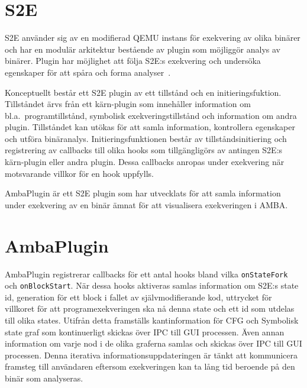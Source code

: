 
\section{S2E}
S2E använder sig av en modifierad QEMU instans för exekvering av olika
binärer och har en modulär arkitektur bestående av plugin som
möjliggör analys av binärer. Plugin har möjlighet att följa S2E:s
exekvering och undersöka egenskaper för att spåra och forma
analyser~\cite{Chipounov12}.

Konceptuellt består ett S2E plugin av ett tillstånd och en
initieringsfuktion. Tillståndet ärvs från ett kärn-plugin som
innehåller information om bl.a.\ programtillstånd, symbolisk
exekveringstillstånd och information om andra plugin. Tillståndet kan
utökas för att samla information, kontrollera egenskaper och utföra
binäranalys. Initieringsfunktionen består av tillståndsinitiering och
registrering av callbacks till olika hooks som tillgängligörs av
antingen S2E:s kärn-plugin eller andra plugin. Dessa callbacks anropas
under exekvering när motsvarande villkor för en hook uppfylls.

AmbaPlugin är ett S2E plugin som har utvecklats för att samla
information under exekvering av en binär ämnat för att visualisera
exekveringen i AMBA.\@

\section{AmbaPlugin}
AmbaPlugin registrerar callbacks för ett antal hooks bland vilka
\texttt{onStateFork} och \texttt{onBlockStart}.
När dessa hooks aktiveras samlas information om S2E:s state id,
generation för ett block i fallet av självmodifierande kod, uttrycket
för villkoret för att programexekveringen ska nå denna state och ett
id som utdelas till olika states. Utifrån detta framställs
kantinformation för CFG och Symbolisk state graf som kontinuerligt
skickas över IPC till GUI processen. Även annan information om varje
nod i de olika graferna samlas och skickas över IPC till GUI
processen. Denna iterativa informationsuppdateringen är tänkt att
kommunicera framsteg till användaren eftersom exekveringen kan ta lång
tid beroende på den binär som analyseras.

